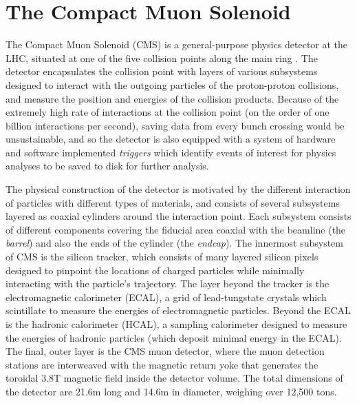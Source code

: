 \section{The Compact Muon Solenoid}
\label{sec:cms}
The Compact Muon Solenoid (CMS) is a general-purpose physics detector at the LHC, situated at one of the five collision points along the main ring \cite{Chatrchyan:2008aa, Bayatian:2006nff}. The detector encapsulates the collision point with layers of various subsystems designed to interact with the outgoing particles of the proton-proton collisions, and measure the position and energies of the collision products. Because of the extremely high rate of interactions at the collision point (on the order of one billion interactions per second), saving data from every bunch crossing would be unsustainable, and so the detector is also equipped with a system of hardware and software implemented {\it triggers} which identify events of interest for physics analyses to be saved to disk for further analysis.

The physical construction of the detector is motivated by the different interaction of particles with different types of materials, and consists of several subsystems layered as coaxial cylinders around the interaction point. Each subsystem consists of different components covering the fiducial area coaxial with the beamline (the {\it barrel}) and also the ends of the cylinder (the {\it endcap}). The innermost subsystem of CMS is the silicon tracker, which consists of many layered silicon pixels designed to pinpoint the locations of charged particles while minimally interacting with the particle's trajectory. The layer beyond the tracker is the electromagnetic calorimeter (ECAL), a grid of lead-tungstate crystals which scintillate to measure the energies of electromagnetic particles. Beyond the ECAL is the hadronic calorimeter (HCAL), a sampling calorimeter designed to measure the energies of hadronic particles (which deposit minimal energy in the ECAL). The final, outer layer is the CMS muon detector, where the muon detection stations are interweaved with the magnetic return yoke that generates the toroidal 3.8T magnetic field inside the detector volume. The total dimensions of the detector are 21.6m long and 14.6m in diameter, weighing over 12,500 tons.


